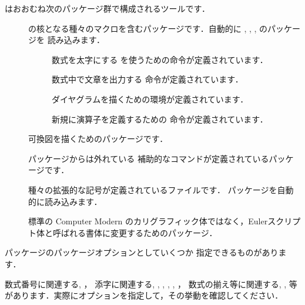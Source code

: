 \AmSLaTeX はおおむね次のパッケージ群で構成されるツールです．
\begin{description}
 \item[]
 \AmSLaTeX の核となる種々のマクロを含むパッケージです．自動的に
 , , , のパッケージを
 読み込みます．
\begin{description}
\item[] 
  数式を太字にする を使うための命令が定義されています．
\item[] 
  数式中で文章を出力する 命令が定義されています．
\item[]  
 ダイヤグラムを描くための環境が定義されています．
\item[]
  新規に演算子を定義するための 
  命令が定義されています．
\end{description}
 \item[] 可換図を描くためのパッケージです．
 \item[] パッケージからは外れている
 補助的なコマンドが定義されているパッケージです．
 \item[] 種々の拡張的な記号が定義されているファイルです．
 パッケージを自動的に読み込みます．
\begin{comment}
 \item[\Y{amsthm}] \env{theorem}環境の拡張をするパッケージです．
 \E{proof}%
 環境と『証明終わり (\Z{Q.E.D.})』を表す記号 \C{qedsymbol} がすでに定義され
 ています．
\end{comment}
 \item[]%
 標準の Computer Modern のカリグラフィック体ではなく，Eulerスクリプト体と呼ばれる書体に変更するためのパッケージ．
\end{description}



\begin{Prob}
パッケージのパッケージオプションとしていくつか
指定できるものがあります．

数式番号に関連する, ，
添字に関連する, , 
, ,  , 
，
数式の揃え等に関連する, , 
等があります．実際にオプションを指定して，その挙動を確認してください．
\end{Prob}



